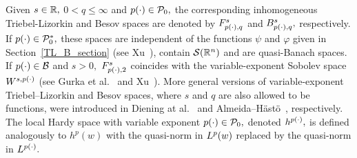 Given $s\in\re,$ $0<q\le \infty$ and $\pp\in\mathcal{P}_0,$ the corresponding inhomogeneous Triebel-Lizorkin and Besov spaces are denoted by $\itl{\pp}{s}{q}$  and  $\ibes{\pp}{s}{q},$
respectively. If $\pp\in\mathcal{P}_0^*,$ these spaces are independent of the functions $\psi$ and $\varphi$ given in  Section~\ref{TL_B_section} (see  Xu~\cite{MR2431378}), contain $\sw$ and are quasi-Banach spaces. If $\pp\in\B$ and $s>0,$ $\itl{\pp}{s}{2}$ coincides with the variable-exponent  Sobolev space $W^{s,\pp}$ (see Gurka et al.~\cite{MR2339558} and Xu~\cite{MR2449626}). More general versions of variable-exponent  Triebel--Lizorkin and Besov spaces, where $s$ and  $q$ are also allowed to be functions, were introduced in  Diening at al.~\cite{MR2498558} and Almeida--H\"ast\"o~\cite{MR2566313}, respectively. 
The local Hardy space with variable exponent $\pp\in \mathcal{P}_0,$  denoted $h^{\pp},$  is defined analogously to $h^p(w)$ with the quasi-norm in $\lebw{p}{w}$ replaced by the quasi-norm in $\Lp.$ 


